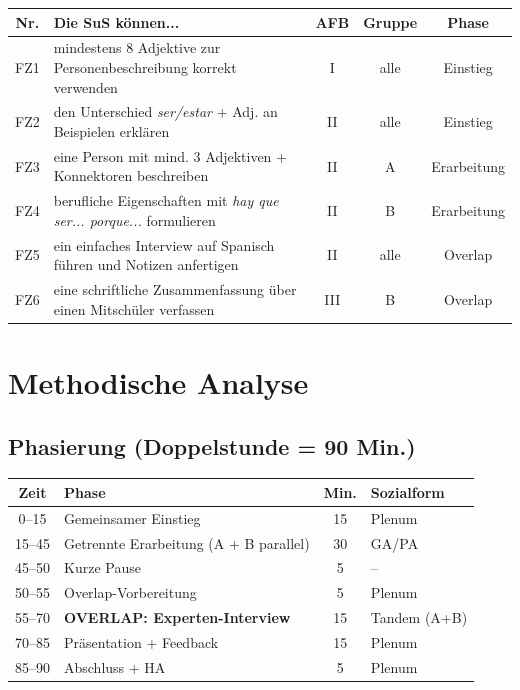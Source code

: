 \documentclass[11pt,a4paper]{article}
\begin{document}
\begin{tabular}{|c|p{7cm}|c|c|c|}
\hline
\textbf{Nr.} & \textbf{Die SuS können...} & \textbf{AFB} & \textbf{Gruppe} & \textbf{Phase} \\
\hline
FZ1 & mindestens 8 Adjektive zur Personenbeschreibung korrekt verwenden & I & alle & Einstieg \\
\hline
FZ2 & den Unterschied \textit{ser/estar} + Adj. an Beispielen erklären & II & alle & Einstieg \\
\hline
FZ3 & eine Person mit mind. 3 Adjektiven + Konnektoren beschreiben & II & A & Erarbeitung \\
\hline
FZ4 & berufliche Eigenschaften mit \textit{hay que ser... porque...} formulieren & II & B & Erarbeitung \\
\hline
FZ5 & ein einfaches Interview auf Spanisch führen und Notizen anfertigen & II & alle & \textcolor{overlap}{Overlap} \\
\hline
FZ6 & eine schriftliche Zusammenfassung über einen Mitschüler verfassen & III & B & \textcolor{overlap}{Overlap} \\
\hline
\end{tabular}

\section{Methodische Analyse}

\subsection{Phasierung (Doppelstunde = 90 Min.)}

\begin{center}
\begin{tabular}{|c|l|c|l|}
\hline
\textbf{Zeit} & \textbf{Phase} & \textbf{Min.} & \textbf{Sozialform} \\
\hline
0--15 & Gemeinsamer Einstieg & 15 & Plenum \\
\hline
15--45 & Getrennte Erarbeitung (A + B parallel) & 30 & GA/PA \\
\hline
45--50 & Kurze Pause & 5 & -- \\
\hline
50--55 & Overlap-Vorbereitung & 5 & Plenum \\
\hline
\rowcolor{lightgray} 55--70 & \textcolor{overlap}{\textbf{OVERLAP: Experten-Interview}} & 15 & \textcolor{overlap}{Tandem (A+B)} \\
\hline
70--85 & Präsentation + Feedback & 15 & Plenum \\
\hline
85--90 & Abschluss + HA & 5 & Plenum \\
\hline
\end{tabular}
\end{center}
\end{document}
